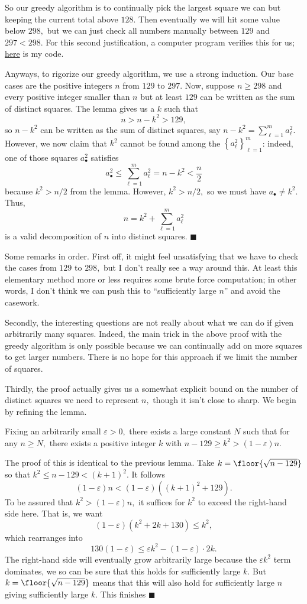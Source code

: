 So our greedy algorithm is to continually pick the largest square we can but keeping the current total above $128.$ Then eventually we will hit some value below $298,$ but we can just check all numbers manually between $129$ and $297<298.$ For this second justification, a computer program verifies this for us; \href{https://replit.com/@NirElber/Distinct-Squares#main.py}{here} is my code.

Anyways, to rigorize our greedy algorithm, we use a strong induction. Our base cases are the positive integers $n$ from $129$ to $297.$ Now, suppose $n\ge298$ and every positive integer smaller than $n$ but at least $129$ can be written as the sum of distinct squares. The lemma gives us a $k$ such that
\[n>n-k^2>129,\]
so $n-k^2$ can be written as the sum of distinct squares, say $n-k^2=\sum_{\ell=1}^ma_\ell^2.$ However, we now claim that $k^2$ cannot be found among the $\left\{a_\ell^2\right\}_{\ell=1}^m$: indeed, one of those squares $a_\bullet^2$ satisfies
\[a_\bullet^2\le\sum_{\ell=1}^ma_\ell^2=n-k^2<\frac n2\]
because $k^2>n/2$ from the lemma. However, $k^2>n/2,$ so we must have $a_\bullet\ne k^2.$ Thus,
\[n=k^2+\sum_{\ell=1}^ma_\ell^2\]
is a valid decomposition of $n$ into distinct squares. $\blacksquare$

Some remarks in order. First off, it might feel unsatisfying that we have to check the cases from $129$ to $298,$ but I don't really see a way around this. At least this elementary method more or less requires some brute force computation; in other words, I don't think we can push this to ``sufficiently large $n$'' and avoid the casework.

Secondly, the interesting questions are not really about what we can do if given arbitrarily many squares. Indeed, the main trick in the above proof with the greedy algorithm is only possible because we can continually add on more squares to get larger numbers. There is no hope for this approach if we limit the number of squares.

Thirdly, the proof actually gives us a somewhat explicit bound on the number of distinct squares we need to represent $n,$ though it isn't close to sharp. We begin by refining the lemma.
\begin{lemma}
    Fixing an arbitrarily small $\varepsilon>0,$ there exists a large constant $N$ such that for any $n\ge N,$ there exists a positive integer $k$ with $n-129\ge k^2>(1-\varepsilon)n.$
\end{lemma}
The proof of this is identical to the previous lemma. Take $k=\floor{\sqrt{n-129}}$ so that $k^2\le n-129<(k+1)^2.$ It follows
\[(1-\varepsilon)n<(1-\varepsilon)\left((k+1)^2+129\right).\]
To be assured that $k^2>(1-\varepsilon)n,$ it suffices for $k^2$ to exceed the right-hand side here. That is, we want
\[(1-\varepsilon)\left(k^2+2k+130\right)\le k^2,\]
which rearranges into
\[130(1-\varepsilon)\le\varepsilon k^2-(1-\varepsilon)\cdot 2k.\]
The right-hand side will eventually grow arbitrarily large because the $\varepsilon k^2$ term dominates, we so can be sure that this holds for sufficiently large $k.$ But $k=\floor{\sqrt{n-129}}$ means that this will also hold for sufficiently large $n$ giving sufficiently large $k.$ This finishes $\blacksquare$

